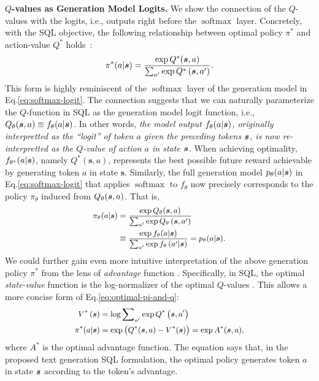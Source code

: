 \noindent\textbf{$Q$-values as Generation Model Logits.}
We show the connection of the $Q$-values with the logits, i.e., outputs right before the $\operatorname{softmax}$ layer.
Concretely, with the SQL objective,
the following relationship between optimal policy $\pi^*$ and action-value $Q^*$ holds~\citep{haarnoja2017reinforcement,schulman2017equivalence}:
\begin{equation}
\small
    \pi^{*}(a | \bm{s})=\frac{\exp Q^{*}(\bm{s}, a)}{\sum_{a^{\prime}} \exp Q^{*}\left(\bm{s}, a^{\prime}\right)}.
    \label{eq:optimal-pi-and-q}
\end{equation}
This form is highly reminiscent of the $\operatorname{softmax}$ layer of the generation model in Eq.\eqref{eq:softmax-logit}. The connection suggests that we can naturally parameterize the $Q$-function in SQL as the generation model logit function, i.e., $Q_\theta(\bm{s}, a) \equiv f_\theta(a|\bm{s})$. In other words, \emph{the model output $f_\theta(a|\bm{s})$, originally interpretted as the ``logit'' of token $a$ given the preceding tokens $\bm{s}$, is now re-interpretted as the $Q$-value of action $a$ in state $\bm{s}$.} When achieving optimality, $f_{\theta^*}(a|\bm{s})$, namely $Q^{*}(\bm{s}, a)$, represents the best possible future reward achievable by generating token $a$ in state $\bm{s}$. Similarly, the full generation model $p_\theta(a|\bm{s})$ in Eq.\eqref{eq:softmax-logit} that applies $\operatorname{softmax}$ to $f_\theta$ now precisely corresponds to the policy $\pi_\theta$ induced from $Q_\theta(\bm{s}, a)$. That is,
\begin{equation}
\small
\begin{aligned}
    \pi_\theta(a | \bm{s})
    &= \frac{\exp Q_\theta(\bm{s}, a)}{\sum_{a^{\prime}} \exp Q_\theta\left(\bm{s}, a^{\prime}\right)} \\
    &\equiv \frac{\exp f_\theta(a | \bm{s})}{\sum_{a^{\prime}} \exp f_\theta\left(a^{\prime} | \bm{s} \right)} 
    = p_\theta(a | \s).
    \label{eq:pi-and-q-theta}
\end{aligned}
\end{equation}
We could further gain even more intuitive interpretation of the above generation policy $\pi^*$ from the lens of \emph{advantage} function  \citep{sutton2018reinforcement}. Specifically, in SQL, the optimal \emph{state-value} function is the log-normalizer of the optimal $Q$-values \citep{haarnoja2017reinforcement,schulman2017equivalence}.
This allows a more concise form of Eq.\eqref{eq:optimal-pi-and-q}:
\begin{equation}
\small
\begin{aligned}
    V^{*}\left(\bm{s}\right) &= \log \sum\nolimits_{a'} \exp Q^{*}\left(\bm{s}, a'\right) \\ %
    \pi^{*}(a | \bm{s}) &= \exp \big(Q^*(\bm{s}, a) - V^*(\bm{s})\big) = \exp A^*(\bm{s}, a),
    \label{eq:sql-state-value}
\end{aligned}
\end{equation}
where $A^*$ is the optimal advantage function. The equation says that, in the proposed text generation SQL formulation, the optimal policy generates token $a$ in state $\bm{s}$ according to the token's advantage.







